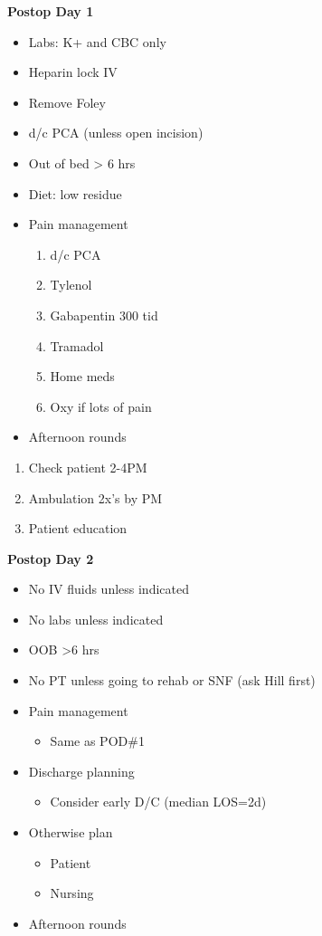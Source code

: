 \documentclass[
]{book}
\providecommand{\tightlist}{%
  \setlength{\itemsep}{0pt}\setlength{\parskip}{0pt}}
\begin{document}
\textbf{Postop Day 1}

\begin{itemize}
\tightlist
\item
  Labs: K+ and CBC only
\item
  Heparin lock IV
\item
  Remove Foley
\item
  d/c PCA (unless open incision)
\item
  Out of bed \textgreater{} 6 hrs
\item
  Diet: low residue
\item
  Pain management

  \begin{enumerate}
  \def\labelenumi{\arabic{enumi})}
  \tightlist
  \item
    d/c PCA
  \item
    Tylenol
  \item
    Gabapentin 300 tid
  \item
    Tramadol
  \item
    Home meds
  \item
    Oxy if lots of pain
  \end{enumerate}
\item
  Afternoon rounds
\end{itemize}

\begin{enumerate}
\def\labelenumi{\arabic{enumi})}
\tightlist
\item
  Check patient 2-4PM
\item
  Ambulation 2x's by PM
\item
  Patient education
\end{enumerate}

\textbf{Postop Day 2}

\begin{itemize}
\tightlist
\item
  No IV fluids unless indicated
\item
  No labs unless indicated
\item
  OOB \textgreater6 hrs
\item
  No PT unless going to rehab or SNF (ask Hill first)
\item
  Pain management

  \begin{itemize}
  \tightlist
  \item
    Same as POD\#1
  \end{itemize}
\item
  Discharge planning

  \begin{itemize}
  \tightlist
  \item
    Consider early D/C (median LOS=2d)
  \end{itemize}
\item
  Otherwise plan

  \begin{itemize}
  \tightlist
  \item
    Patient
  \item
    Nursing
  \end{itemize}
\item
  Afternoon rounds
\end{itemize}
\end{document}
